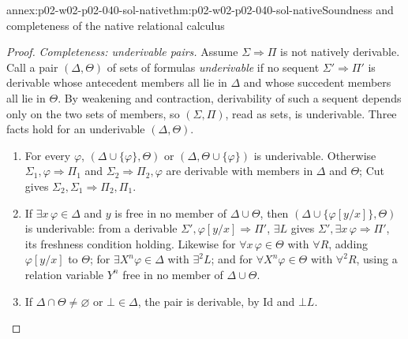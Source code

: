 \begin{annexitem}{annex:p02-w02-p02-040-sol-native}{thm:p02-w02-p02-040-sol-native}{Soundness and completeness of the native relational calculus}
\begin{proof}
\emph{Completeness: underivable pairs.}  Assume \(\Sigma\Rightarrow\Pi\) is not
natively derivable.  Call a pair \((\Delta,\Theta)\) of sets of formulas
\emph{underivable} if no sequent \(\Sigma'\Rightarrow\Pi'\) is derivable whose
antecedent members all lie in \(\Delta\) and whose succedent members all lie
in \(\Theta\).  By weakening and contraction, derivability of such a sequent
depends only on the two sets of members, so \((\Sigma,\Pi)\), read as sets,
is underivable.  Three facts hold for an underivable \((\Delta,\Theta)\).
\begin{enumerate}
 \item[(P1)] For every \(\varphi\), \((\Delta\cup\{\varphi\},\Theta)\) or
   \((\Delta,\Theta\cup\{\varphi\})\) is underivable.  Otherwise
   \(\Sigma_1,\varphi\Rightarrow\Pi_1\) and \(\Sigma_2\Rightarrow\Pi_2,\varphi\) are
   derivable with members in \(\Delta\) and \(\Theta\); Cut gives
   \(\Sigma_2,\Sigma_1\Rightarrow\Pi_2,\Pi_1\).
 \item[(P2)] If \(\exists x\,\varphi\in\Delta\) and \(y\) is free in no member of
   \(\Delta\cup\Theta\), then \((\Delta\cup\{\varphi[y/x]\},\Theta)\) is
   underivable: from a derivable \(\Sigma',\varphi[y/x]\Rightarrow\Pi'\),
   \(\exists L\) gives \(\Sigma',\exists x\,\varphi\Rightarrow\Pi'\), its freshness
   condition holding.  Likewise for \(\forall x\,\varphi\in\Theta\) with
   \(\forall R\), adding \(\varphi[y/x]\) to \(\Theta\); for
   \(\exists X^n\varphi\in\Delta\) with \(\exists^2L\); and for
   \(\forall X^n\varphi\in\Theta\) with \(\forall^2R\), using a relation
   variable \(Y^n\) free in no member of \(\Delta\cup\Theta\).
 \item[(P3)] If \(\Delta\cap\Theta\neq\varnothing\) or \(\bot\in\Delta\), the
   pair is derivable, by Id and \(\bot L\).
\end{enumerate}


\end{proof}
\end{annexitem}
